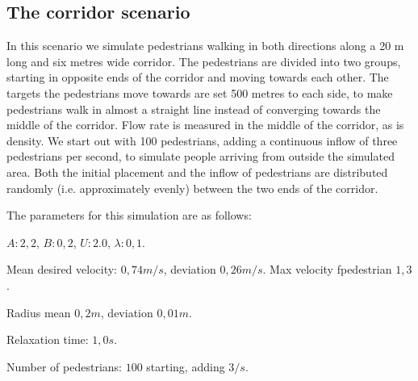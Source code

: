 \subsection{The corridor scenario}
In this scenario we simulate pedestrians walking in both directions along a 20 
m long and six metres wide corridor. The pedestrians are divided into two 
groups, starting in opposite ends of the corridor and moving towards each 
other. The targets the pedestrians move towards are set 500 metres to each 
side, to make pedestrians walk in almost a straight line instead of converging 
towards the middle of the corridor. Flow rate is measured in the middle of the 
corridor, as is density. We start out with 100 pedestrians, adding a 
continuous inflow of three pedestrians per second, to simulate people arriving 
from outside the simulated area. Both the initial placement and the inflow of 
pedestrians are distributed randomly (i.e. approximately evenly) between the 
two ends of the corridor.

The parameters for this simulation are as follows:

\begin{itemize*}
    \item $A: 2,2$, $B: 0,2$, $U: 2.0$, $\lambda: 0,1$.
    \item Mean desired velocity: $0,74 m/s$, deviation $0,26 m/s$. Max 
        velocity fpedestrian $1,3$.
    \item Radius mean $0,2 m$, deviation $0,01 m$.
    \item Relaxation time: $1,0 s$.
    \item Number of pedestrians: $100$ starting, adding $3/s$.
\end{itemize*}

